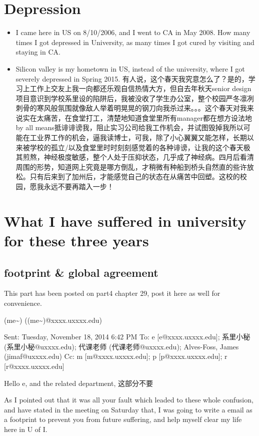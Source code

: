 \documentclass[9pt,b5paper]{article}
\begin{document}
\section{Depression}
\label{sec-4}
\begin{itemize}
\item I came here in US on 8/10/2006, and I went to CA in May 2008. How many times I got depressed in University, as many times I got cured by visiting and staying in CA.
\item Silicon valley is my hometown in US, instead of the university, where I got severely depressed in Spring 2015. 有人说，这个春天我究意怎么了？是的，学习上工作上交友上我一向都还乐观自信热情大方，但自去年秋天senior design项目意识到学校系里设的陷阱后，我被没收了学生办公室，整个校园严冬凛冽刺骨的寒风般氛围就像敌人举着明晃晃的钢刀向我杀过来。。。这个春天对我来说实在太痛苦，在食堂打工，清楚地知道食堂里所有manager都在想方设法地by all means抵诽诽谤我，阻止实习公司给我工作机会，并试图毁掉我所以可能在工业界工作的机会，逼我读博士，可我，除了小心翼翼又能怎样，长期以来被学校的孤立/以及食堂里时时刻刻感觉着的各种诽谤，让我的这个春天极其煎熬，神经极度敏感，整个人处于压抑状态，几乎成了神经病。四月后看清周围的形势，知道网上究竟是哪方倒乱，才稍微有种船到桥头自然直的些许放松。只有后来到了加州后，才能感觉自己的状态在从痛苦中回塑。这校的校园，愿我永远不要再踏入一步！
\end{itemize}

\section{What I have suffered in university for these three years}
\label{sec-5}
\subsection{footprint \& global agreement}
\label{sec-5-1}
This part has been posted on part4 chapter 29, post it here as well for convenience. 

(me\textasciitilde{}) ((me\textasciitilde{})@xxxx.uxxxx.edu)

Sent:        Tuesday, November 18, 2014 6:42 PM
To:        
e [e@xxxx.uxxxx.edu]; 系里小秘 (系里小秘@uxxxx.edu); 代课老师 (代课老师@uxxxx.edu); Alves-Foss, James (jimaf@uxxxx.edu)
Cc:        
m [m@xxxx.uxxxx.edu]; p [p@xxxx.uxxxx.edu]; r [r@xxxx.uxxxx.edu]

Hello e, and the related department, 这部分不要

As I pointed out that it was all your fault which leaded to these whole confusion, and have stated in the meeting on Saturday that, I was going to write a email as a footprint to prevent you from future suffering, and help myself clear my life here in U of I. 
\end{document}
